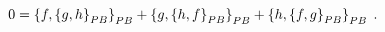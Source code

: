\begin{equation}
0=\left\{  f,\left\{  g,h\right\}  _{{\footnotesize PB}}\right\}
_{{\footnotesize PB}}+\left\{  g,\left\{  h,f\right\}  _{{\footnotesize PB}%
}\right\}  _{{\footnotesize PB}}+\left\{  h,\left\{  f,g\right\}
_{{\footnotesize PB}}\right\}  _{{\footnotesize PB}}\;. \label{PBJI}%
\end{equation}


